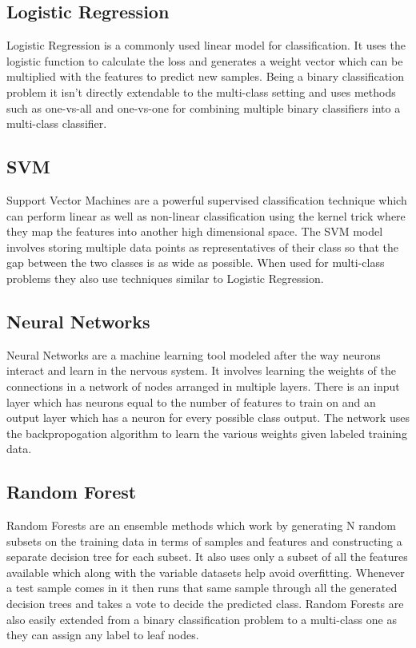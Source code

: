 \documentclass[]{sig-alternate}
\begin{document}
\subsection{Logistic Regression}
\label{subsec:LogisticRegression}

Logistic Regression is a commonly used linear model for classification. It uses the logistic function to calculate the loss and generates a weight vector which can be multiplied with the features to predict new samples. Being a binary classification problem it isn't directly extendable to the multi-class setting and uses methods such as one-vs-all and one-vs-one for combining multiple binary classifiers into a multi-class classifier. 

\subsection{SVM}
\label{subsec:SVM}

Support Vector Machines are a powerful supervised classification technique which can perform linear as well as non-linear classification using the kernel trick where they map the features into another high dimensional space. The SVM model involves storing multiple data points as representatives of their class so that the gap between the two classes is as wide as possible. When used for multi-class problems they also use techniques similar to Logistic Regression. 

\subsection{Neural Networks}
\label{subsec:NeuralNetworks}

Neural Networks are a machine learning tool modeled after the way neurons interact and learn in the nervous system. It involves learning the weights of the connections in a network of nodes arranged in multiple layers. There is an input layer which has neurons equal to the number of features to train on and an output layer which has a neuron for every possible class output. The network uses the backpropogation algorithm to learn the various weights given labeled training data. 

\subsection{Random Forest}
\label{subsec:RandomForest}

Random Forests are an ensemble methods which work by generating N random subsets on the training data in terms of samples and features and constructing a separate decision tree for each subset. It also uses only a subset of all the features available which along with the variable datasets help avoid overfitting. Whenever a test sample comes in it then runs that same sample through all the generated decision trees and takes a vote to decide the predicted class. Random Forests are also easily extended from a binary classification problem to a multi-class one as they can assign any label to leaf nodes. 
\end{document}
